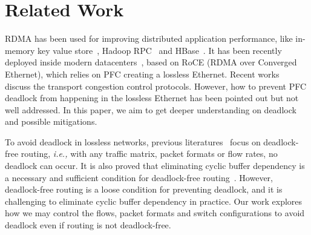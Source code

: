 \secspace
\section{Related Work}
\secspace

 RDMA has been used for improving distributed application performance,
like in-memory key value store~\cite{mitchell13atc, farm, kalia14sigcomm}, 
Hadoop RPC~\cite{hadooprdma} and HBase~\cite{hbaserdma}.
It has been recently deployed inside modern datacenters~\cite{timely,dcqcn,rdmascale}, based on
RoCE (RDMA over Converged Ethernet), which relies on PFC creating a lossless Ethernet.
Recent works~\cite{timely,dcqcn} discuss the transport congestion control protocols. However,
how to prevent PFC deadlock from happening in the lossless Ethernet has been pointed out 
but not well addressed. In this paper, we aim to get deeper understanding on deadlock 
and possible mitigations.

 To avoid deadlock in lossless networks, previous 
literatures~\cite{tcpbolt,karol2003prevention} focus on deadlock-free routing, 
{\em i.e.,} with any traffic matrix, packet formats or flow rates, no deadlock 
can occur. It is also proved that eliminating cyclic buffer dependency is a necessary and
sufficient condition for deadlock-free routing~\cite{deadlockfree}. However, deadlock-free
routing is a loose condition for preventing deadlock, and it is challenging to eliminate 
cyclic buffer dependency in practice. Our work explores how we may control the flows,
packet formats and switch configurations to avoid deadlock even if routing is not deadlock-free.






